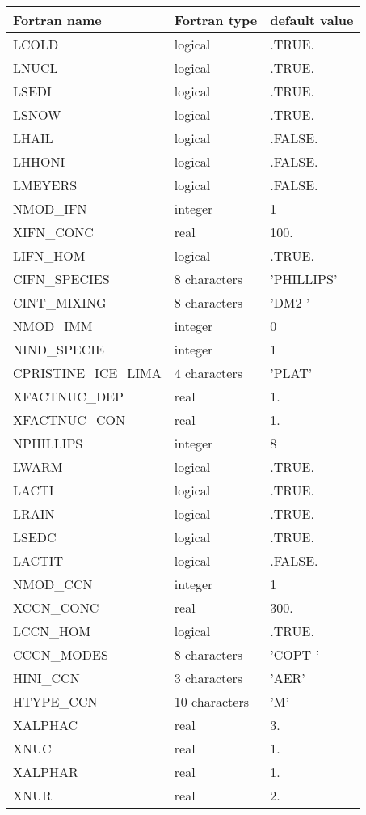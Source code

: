 \begin{longtable} {|p{}|p{}|p{}|}
\hline
Fortran name &  Fortran type & default value \\
\hline
\endhead
\hline
\endfoot
LCOLD         &  logical     & .TRUE. \\
LNUCL & logical	  &  .TRUE. \\
LSEDI &  logical&  .TRUE. \\
LSNOW & logical  &  .TRUE.\\
LHAIL &  logical& .FALSE. \\
LHHONI & logical &  .FALSE.\\
LMEYERS & logical   & .FALSE. \\
NMOD\_IFN & integer   & 1  \\
XIFN\_CONC & real & 100.  \\
LIFN\_HOM & logical & .TRUE.  \\
CIFN\_SPECIES & 8 characters   & 'PHILLIPS' \\
CINT\_MIXING &8 characters  & 'DM2     ' \\
NMOD\_IMM & integer &0  \\
NIND\_SPECIE & integer & 1 \\
CPRISTINE\_ICE\_LIMA & 4 characters &  'PLAT' \\
XFACTNUC\_DEP & real  & 1. \\
XFACTNUC\_CON & real & 1. \\
NPHILLIPS & integer  & 8 \\
LWARM & logical  & .TRUE. \\
LACTI& logical  & .TRUE. \\
LRAIN& logical  & .TRUE. \\
LSEDC& logical  & .TRUE. \\
LACTIT& logical  & .FALSE. \\
NMOD\_CCN & integer   & 1  \\
XCCN\_CONC & real & 300.  \\
LCCN\_HOM & logical & .TRUE.  \\
CCCN\_MODES &  8 characters & 'COPT    '  \\
HINI\_CCN & 3 characters  & 'AER' \\
HTYPE\_CCN & 10 characters & 'M'  \\
XALPHAC & real & 3.  \\
XNUC & real  & 1.  \\
XALPHAR &  real& 1. \\
XNUR & real  & 2. \\

\end{longtable}

